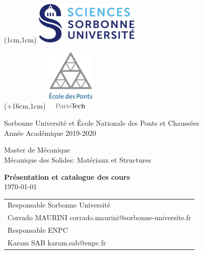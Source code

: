 \documentclass[french,11pt]{article}
\begin{document}
\begin{titlepage}

\begin{textblock*}{297mm}(1cm,1cm)%
\includegraphics[height=2cm]{figures/logoSU.png}
\end{textblock*}%
\begin{textblock*}{297mm}(+16cm,1cm)%
\includegraphics[height=3cm]{figures/logo-enpc.png}
\end{textblock*}%

\vspace*{3cm}
\begin{center}

\large Sorbonne Université et École Nationale des Ponts et Chaussées \medskip
\\


Année Académique  2019-2020\\ 

\end{center}

\vspace*{3cm}
\begin{center}
\LARGE Master de Mécanique\\
Mécanique des Solides:
 Matériaux et  Structures
\end{center}
\noindent\vspace*{3cm}
\begin{center}
\textbf{\Large Présentation et catalogue des cours}\\
\today\\

\end{center}


\vfill

\begin{flushleft}
\begin{tabular}{l}
Responsable Sorbonne Université\\ 
Corrado MAURINI
corrado.maurini@sorbonne-universite.fr\medskip\\
Responsable ENPC\\
Karam SAB karam.sab@enpc.fr
\end{tabular}
{}\end{flushleft} 

\end{titlepage}
\setcounter{tocdepth}{2}
\begin{tableofcontents}
\end{tableofcontents}
\newpage
\end{document}
